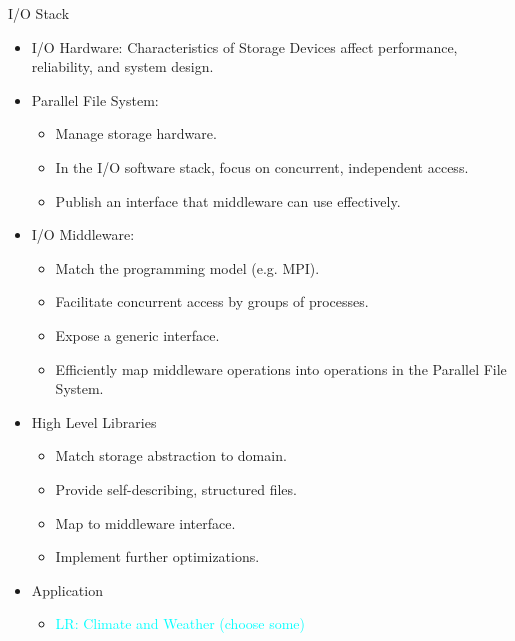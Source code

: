 \documentclass[compress,11pt,xcolor=svgnames,aspectratio=169]{beamer}
\newcommand{\lr}[1]{\textcolor{cyan}{LR: #1}}
\begin{document}
\begin{frame}[fragile]{I/O Stack}

\begin{itemize}

\item I/O Hardware: Characteristics of Storage Devices affect performance, reliability, and system design.

\item Parallel File System:
  \begin{itemize}
  \item Manage storage hardware.
  \item In the I/O software stack, focus on concurrent, independent access.
  \item Publish an interface that middleware can use effectively.
  \end{itemize}

\item I/O Middleware:
  \begin{itemize}
  \item Match the programming model (e.g. MPI).
  \item Facilitate concurrent access by groups of processes.
  \item Expose a generic interface.
  \item Efficiently map middleware operations into operations in the Parallel File System.
  \end{itemize}

\item High Level Libraries
  \begin{itemize}
  \item Match storage abstraction to domain.
  \item Provide self-describing, structured files.
  \item Map to middleware interface.
  \item Implement further optimizations.
  \end{itemize}

\item Application
  \begin{itemize}
  \item \lr{Climate and Weather (choose some)}
  \end{itemize}

\end{itemize}


\end{frame}
\end{document}
